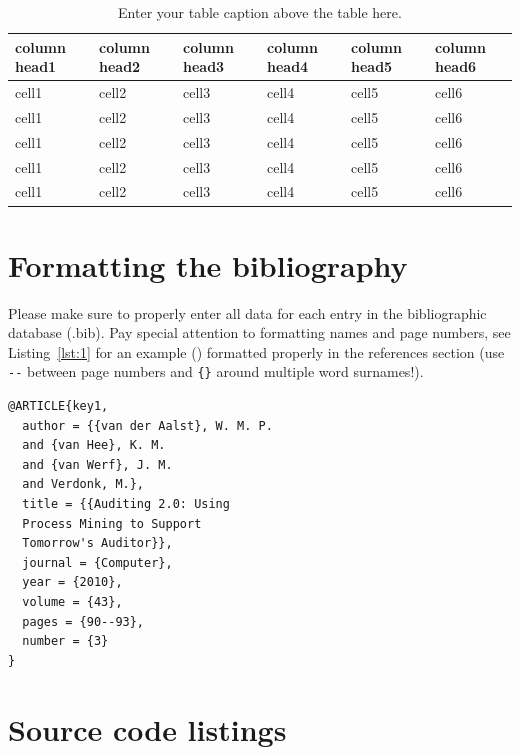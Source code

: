 \documentclass[british]{emisa}
\begin{document}
\begin{article}
\begin{table}[tb]
\centering
\caption{Enter your table caption above the table here.}
\begin{tabular}{llllll}
\toprule
column head1 & column head2 & column head3 & column head4 & column head5 & column head6\\
\midrule
cell1 & cell2 & cell3 & cell4 & cell5 & cell6\\
cell1 & cell2 & cell3 & cell4 & cell5 & cell6\\
cell1 & cell2 & cell3 & cell4 & cell5 & cell6\\
cell1 & cell2 & cell3 & cell4 & cell5 & cell6\\
cell1 & cell2 & cell3 & cell4 & cell5 & cell6\\
\bottomrule
\end{tabular}
\label{tab:unique-label}
\end{table}






\section{Formatting the bibliography}\label{sec:bib}

Please make sure to properly enter all data for each entry in the bibliographic database (.bib). Pay special attention to formatting names and page numbers, see Listing~\ref{lst:1} for an example (\cite{key1}) formatted properly in the references section (use \verb|--| between page numbers and \verb|{}| around multiple word surnames!). 

\begin{lstlisting}[float,caption={Enter your single-column listing caption here.},label={lst:1}]
@ARTICLE{key1,
  author = {{van der Aalst}, W. M. P. 
  and {van Hee}, K. M. 
  and {van Werf}, J. M. 
  and Verdonk, M.},
  title = {{Auditing 2.0: Using 
  Process Mining to Support 
  Tomorrow's Auditor}},
  journal = {Computer},
  year = {2010},
  volume = {43},
  pages = {90--93},
  number = {3}
}
\end{lstlisting}



\section{Source code listings}\label{sec:listings}


\end{article}
\end{document}
